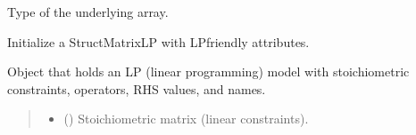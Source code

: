 \documentclass[letterpaper,12pt,english]{sphinxmanual}
\begin{document}
\begin{fulllineitems}
\begin{fulllineitems}
\begin{quote}
\begin{description}
\end{description}\end{quote}

\end{fulllineitems}


\begin{fulllineitems}
\label{\detokenize{api/core:cbmpy.CBCommon.StructMatrixLP.__array_type__}}
\pysigstartsignatures
\pysigline
{}
\pysigstopsignatures
\sphinxAtStartPar
Type of the underlying array.
\begin{quote}\begin{description}
\sphinxAtStartPar
{}

\end{description}\end{quote}

\end{fulllineitems}


\begin{fulllineitems}
\label{\detokenize{api/core:cbmpy.CBCommon.StructMatrixLP.__init__}}
\pysigstartsignatures
\pysiglinewithargsret
{}
{\sphinxparamcomma {}\sphinxparamcomma {}\sphinxparamcomma {}\sphinxparamcomma {}\sphinxparamcomma {}\sphinxparamcomma {}}
{}
\pysigstopsignatures
\sphinxAtStartPar
Initialize a StructMatrixLP with LP\sphinxhyphen{}friendly attributes.

\sphinxAtStartPar
Object that holds an LP (linear programming) model with stoichiometric constraints,
operators, RHS values, and names.
\begin{quote}\begin{description}
\begin{itemize}
\item {} 
\sphinxAtStartPar
{} () \textendash{} Stoichiometric matrix (linear constraints).


\end{itemize}
\end{description}
\end{quote}
\end{fulllineitems}
\end{fulllineitems}
\end{document}
